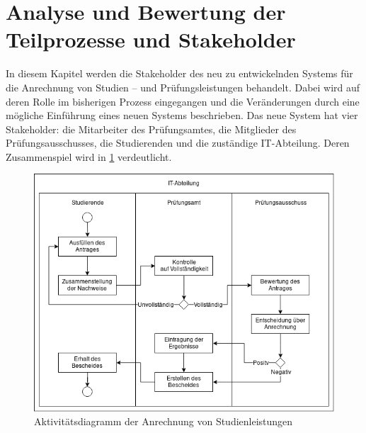 \section{Analyse und Bewertung der Teilprozesse und Stakeholder}

In diesem Kapitel werden die Stakeholder des neu zu entwickelnden Systems für die Anrechnung von Studien – und Prüfungsleistungen behandelt. Dabei wird auf deren Rolle im bisherigen Prozess eingegangen und die Veränderungen durch eine mögliche Einführung eines neuen Systems beschrieben. Das neue System hat vier Stakeholder: die Mitarbeiter des Prüfungsamtes, die Mitglieder des Prüfungsausschusses, die Studierenden und die zuständige IT-Abteilung. Deren Zusammenspiel wird in \cref{fig:abbildung} verdeutlicht.

\begin{figure}
\includegraphics[width=\textwidth,keepaspectratio]{../../images/analoger_prozess.png}%
\caption{Aktivitätsdiagramm der Anrechnung von Studienleistungen}%
\label{fig:abbildung}
\end{figure}






